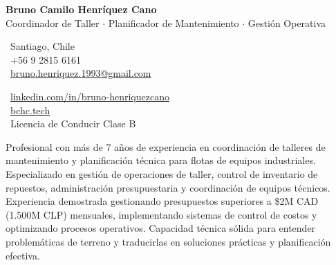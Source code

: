 \documentclass[10pt,letterpaper]{article}
\begin{document}
\begin{center}
    {\Huge \textbf{Bruno Camilo Henríquez Cano}} \\[0.2cm]
    {\Large Coordinador de Taller $\cdot$ Planificador de Mantenimiento $\cdot$ Gestión Operativa}
\end{center}

\vspace{0.3cm}

\noindent
\begin{minipage}[t]{0.5\textwidth}
    \faMapMarker\ Santiago, Chile \\
    \faPhone\ +56 9 2815 6161 \\
    \faEnvelope\ \href{mailto:bruno.henriquez.1993@gmail.com}{bruno.henriquez.1993@gmail.com}
\end{minipage}
\begin{minipage}[t]{0.5\textwidth}
    \faLinkedin\ \href{https://linkedin.com/in/bruno-henriquezcano}{linkedin.com/in/bruno-henriquezcano} \\
    
    \faGlobe\ \href{https://bchc.tech}{bchc.tech} \\
    \faCar\ Licencia de Conducir Clase B
\end{minipage}

\vspace{0.4cm}


\vspace{0.2cm}

\noindent Profesional con más de 7 años de experiencia en coordinación de talleres de mantenimiento y planificación técnica para flotas de equipos industriales. Especializado en gestión de operaciones de taller, control de inventario de repuestos, administración presupuestaria y coordinación de equipos técnicos. Experiencia demostrada gestionando presupuestos superiores a \$2M CAD (1.500M CLP) mensuales, implementando sistemas de control de costos y optimizando procesos operativos. Capacidad técnica sólida para entender problemáticas de terreno y traducirlas en soluciones prácticas y planificación efectiva.

\vspace{0.4cm}


\vspace{0.3cm}
\end{document}
